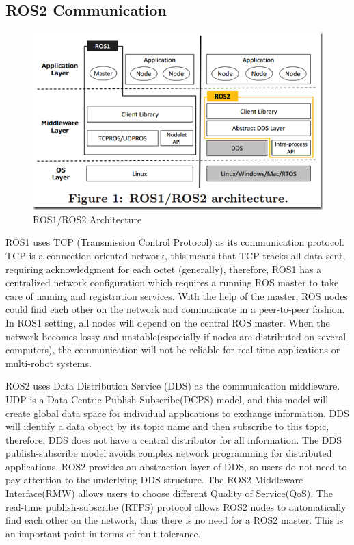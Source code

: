 \documentclass[letterpaper, 10 pt, conference]{ieeeconf}  %
\begin{document}
\subsection{ROS2 Communication}
\begin{figure}[ht]
  \includegraphics[width=\linewidth]{ros1_ros2_architecture.png}
  \caption{ROS1/ROS2 Architecture \cite{c1}} 
  \label{fig:ros2_architecture}
\end{figure}

ROS1 uses TCP (Transmission Control Protocol) as its communication protocol. TCP is a connection oriented network, this means that TCP tracks all data sent, requiring acknowledgment for each octet (generally), therefore,  ROS1 has a centralized network configuration which requires a running ROS master to take care of naming and registration services. With the help of the master, ROS nodes could find each other on the network and communicate in a peer-to-peer fashion. In ROS1 setting, all nodes will depend on the central ROS master. When the network becomes lossy and unstable(especially if nodes are distributed on several computers), the communication will not be reliable for real-time applications or multi-robot systems.
\par\vspace{3pt} 
ROS2 uses Data Distribution Service (DDS) as the communication middleware. UDP is a Data-Centric-Publish-Subscribe(DCPS) model, and this model will create global data space for individual applications to exchange information. DDS will identify a data object by its topic name and then subscribe to this topic, therefore, DDS does not have a central distributor for all information. The DDS publish-subscribe model avoids complex network programming for distributed applications.  ROS2 provides an abstraction layer of DDS, so users do not need to pay attention to the underlying DDS structure. The ROS2 Middleware Interface(RMW) allows users to choose different Quality of Service(QoS). The real-time publish-subscribe (RTPS) protocol allows ROS2 nodes to automatically find each other on the network, thus there is no need for a ROS2 master. This is an important point in terms of fault tolerance.
\end{document}
